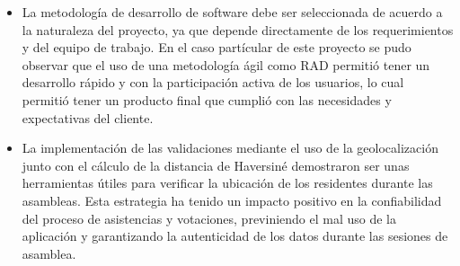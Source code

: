 \begin{itemize}
    \item La metodología de desarrollo de software debe ser seleccionada de acuerdo a la naturaleza del proyecto, ya que depende directamente de los requerimientos y del equipo de trabajo.
    En el caso partícular de este proyecto se pudo observar que el uso de una metodología ágil como RAD permitió tener un desarrollo rápido y con la participación activa de los usuarios, lo cual permitió tener un producto final que cumplió con las necesidades y expectativas del cliente.
    \item La implementación de las validaciones mediante el uso de la geolocalización junto con el cálculo de la distancia de Haversiné demostraron ser unas herramientas útiles para verificar la ubicación de los residentes durante las asambleas.
    Esta estrategia ha tenido un impacto positivo en la confiabilidad del proceso de asistencias y votaciones, previniendo el mal uso de la aplicación y garantizando la autenticidad de los datos durante las sesiones de asamblea.
\end{itemize}
